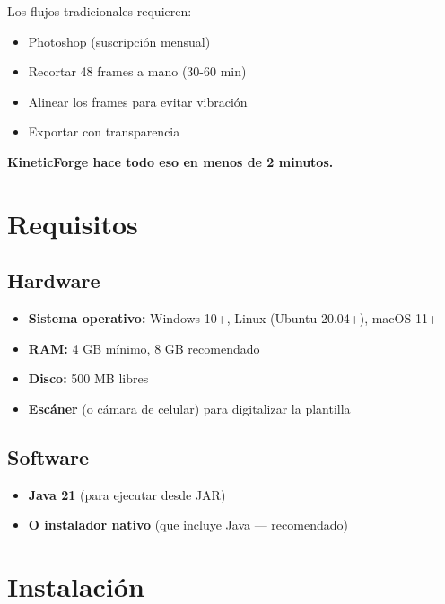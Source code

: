 \documentclass[12pt,a4paper]{article}
\begin{document}
Los flujos tradicionales requieren:
\begin{itemize}[leftmargin=*]
    \item Photoshop (suscripción mensual)
    \item Recortar 48 frames a mano (30-60 min)
    \item Alinear los frames para evitar vibración
    \item Exportar con transparencia
\end{itemize}

\textbf{KineticForge hace todo eso en menos de 2 minutos.}

\section{Requisitos}

\subsection{Hardware}
\begin{itemize}[leftmargin=*]
    \item \textbf{Sistema operativo:} Windows 10+, Linux (Ubuntu 20.04+), macOS 11+
    \item \textbf{RAM:} 4 GB mínimo, 8 GB recomendado
    \item \textbf{Disco:} 500 MB libres
    \item \textbf{Escáner} (o cámara de celular) para digitalizar la plantilla
\end{itemize}

\subsection{Software}
\begin{itemize}[leftmargin=*]
    \item \textbf{Java 21} (para ejecutar desde JAR)
    \item \textbf{O instalador nativo} (que incluye Java — recomendado)
\end{itemize}

\section{Instalación}
\end{document}
